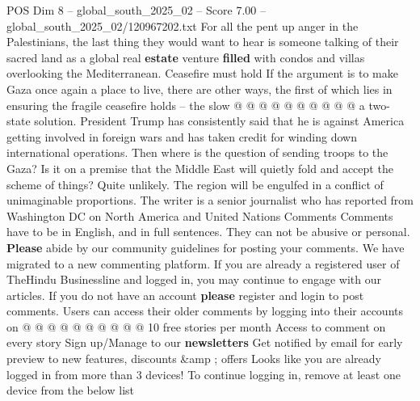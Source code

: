 \begin{textsample}{POS Dim 8 – global\_south\_2025\_02 – Score 7.00 – global\_south\_2025\_02/120967202.txt}
For all the pent up anger in the Palestinians, the last thing they would want to hear is someone talking of their sacred land as a global real \textbf{estate} venture \textbf{filled} with condos and villas overlooking the Mediterranean.
Ceasefire must hold If the argument is to make Gaza once again a place to live, there are other ways, the first of which lies in ensuring the fragile ceasefire holds -- the slow @ @ @ @ @ @ @ @ @ @ a two-state solution.
President Trump has consistently said that he is against America getting involved in foreign wars and has taken credit for winding down international operations.
Then where is the question of sending troops to the Gaza?
Is it on a premise that the Middle East will quietly fold and accept the scheme of things?
Quite unlikely.
The region will be engulfed in a conflict of unimaginable proportions.
The writer is a senior journalist who has reported from Washington DC on North America and United Nations Comments Comments have to be in English, and in full sentences.
They can not be abusive or personal. \textbf{Please} abide by our community guidelines for posting your comments.
We have migrated to a new commenting platform.
If you are already a registered user of TheHindu Businessline and logged in, you may continue to engage with our articles.
If you do not have an account \textbf{please} register and login to post comments.
Users can access their older comments by logging into their accounts on @ @ @ @ @ @ @ @ @ @ 10 free stories per month Access to comment on every story Sign up/Manage to our \textbf{newsletters} Get notified by email for early preview to new features, discounts \&amp ; offers Looks like you are already logged in from more than 3 devices!
To continue logging in, remove at least one device from the below list

\end{textsample}
